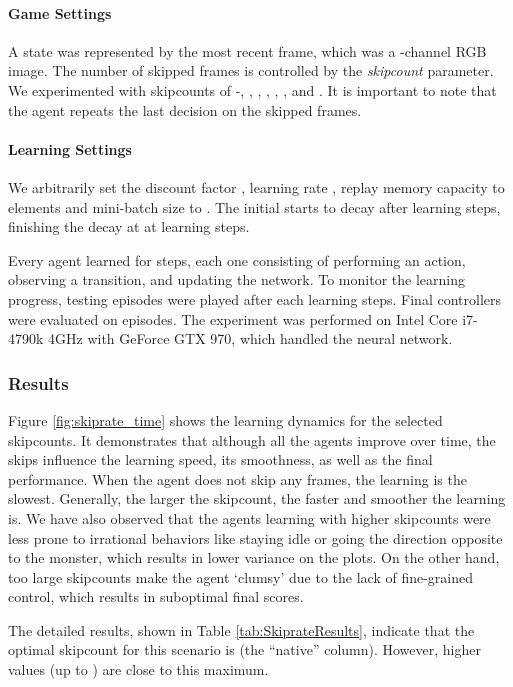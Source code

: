 \documentclass[english,american,conference, balance]{IEEEtran}
\begin{document}
\paragraph{Game Settings}

A state was represented by the most recent frame, which was a 
-channel RGB image. The number of skipped frames is controlled
by the \emph{skipcount} parameter. We experimented with skipcounts\emph{
}of -, , , , , ,  and .
It is important to note that the agent repeats the last decision on
the skipped frames.

\paragraph{Learning Settings}

We arbitrarily set the discount factor , learning rate
, replay memory capacity to  elements and
mini-batch size to . The initial  starts to decay
after  learning steps, finishing the decay at 
at  learning steps.

Every agent learned for  steps, each one consisting of
performing an action, observing a transition, and updating the network.
To monitor the learning progress,  testing episodes were played
after each  learning steps. Final controllers were evaluated
on  episodes. The experiment was performed on Intel Core
i7-4790k 4GHz with GeForce GTX 970, which handled the neural network.

\subsubsection{Results}

Figure \ref{fig:skiprate_time} shows the learning dynamics for the
selected skipcounts. It demonstrates that although all the agents
improve over time, the skips influence the learning speed, its smoothness,
as well as the final performance. When the agent does not skip any
frames, the learning is the slowest. Generally, the larger the skipcount,
the faster and smoother the learning is. We have also observed that
the agents learning with higher skipcounts were less prone to irrational
behaviors like staying idle or going the direction opposite to the
monster, which results in lower variance on the plots. On the other
hand, too large skipcounts make the agent `clumsy' due to the lack
of fine-grained control, which results in suboptimal final scores. 

The detailed results, shown in Table \ref{tab:SkiprateResults}, indicate
that the optimal skipcount for this scenario is  (the ``native''
column). However, higher values (up to ) are close to this maximum. 
\end{document}
